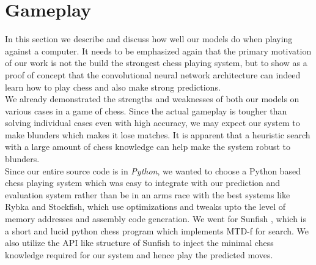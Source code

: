 \section{Gameplay}
In this section we describe and discuss how well our models do when playing 
against a computer. It needs to be emphasized again that the primary 
motivation of our work is not the build the strongest chess playing 
system, but to show as a proof of concept that the convolutional neural 
network architecture can indeed learn how to play chess and also make strong 
predictions. \\
We already demonstrated the strengths and weaknesses of both our 
models on various cases in a game of chess. Since the actual gameplay is 
tougher than solving individual cases even with high accuracy, we may expect our 
system to make blunders which makes it lose matches. It is apparent that a 
heuristic search with a large amount of chess knowledge can help make the system 
robust to blunders.\\

Since our entire source code is in \textit{Python}, we wanted to choose a 
Python based chess playing system which was easy to integrate with our 
prediction and evaluation system rather than be in an arms race with the best 
systems like Rybka \cite{wiki:rybka} and Stockfish, which use optimizations and 
tweaks upto 
the level of memory addresses and assembly code generation. We went for Sunfish 
\cite{sunfish}, which is a short and lucid python chess program which implements 
MTD-f for search. We also utilize the API like structure of Sunfish to inject 
the minimal chess knowledge required for our system and hence play the predicted 
moves.\\

